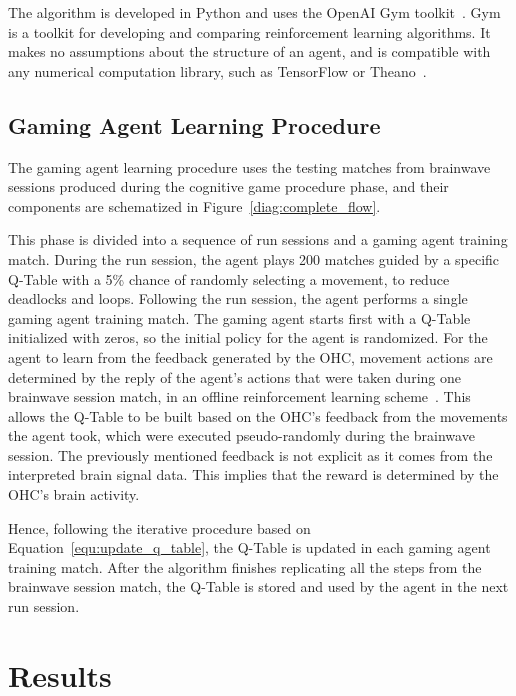 \documentclass[journal]{IEEEtran}
\begin{document}
{{The algorithm is developed in Python and uses the OpenAI Gym toolkit~\cite{openai}. Gym is a toolkit for developing and comparing reinforcement learning algorithms. It makes no assumptions about the structure of an agent, and is compatible with any numerical computation library, such as TensorFlow or Theano~\cite{tensorflow2015-whitepaper}.

\subsection{Gaming Agent Learning Procedure}
\label{q_learning_step_alg}

The gaming agent learning procedure uses the testing matches from brainwave sessions produced during the cognitive game procedure phase, and their components are schematized in Figure~\ref{diag:complete_flow}.

This phase is divided into a sequence of run sessions and a gaming agent training match.  During the run session, the agent plays 200 matches guided by a specific Q-Table with a 5\% chance of randomly selecting a movement, to reduce deadlocks and loops.  Following the run session, the agent performs a single gaming agent training match.  The gaming agent starts first with a Q-Table initialized with zeros, so the initial policy for the agent is randomized.  For the agent to learn from the feedback generated by the OHC, movement actions are determined by the reply of the agent's actions that were taken during one brainwave session match, in an offline reinforcement learning scheme~\cite{Levine2020}. This allows the Q-Table to be built based on the OHC's feedback from the movements the agent took, which were executed pseudo-randomly during the brainwave session.  The previously mentioned feedback is not explicit as it comes from the interpreted brain signal data. This implies that the reward is determined by the OHC's brain activity.

Hence, following the iterative procedure based on Equation~\ref{equ:update_q_table}, the Q-Table is updated in each gaming agent training match. After the algorithm finishes replicating all the steps from the brainwave session match, the Q-Table is stored and used by the agent in the next run session.


\section{Results}
\label{results}


}}
\end{document}
